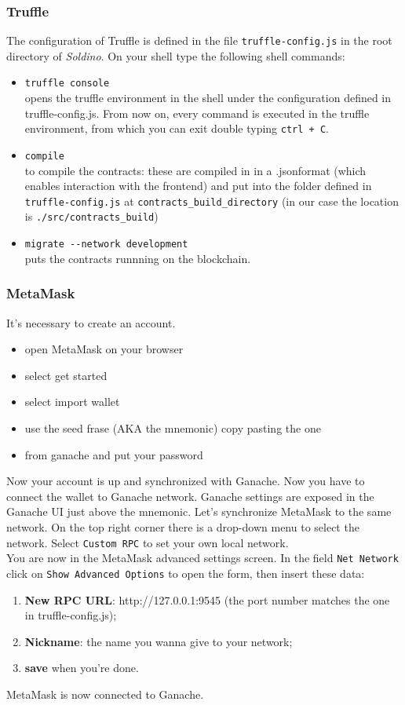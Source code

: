 \subsubsection{Truffle}
The configuration of Truffle is defined in the file \texttt{truffle-config.js} in the root directory of \textit{Soldino}.
On your shell type the following shell commands:
\begin{itemize}
	\item \texttt{truffle console}\\
	opens the truffle environment in the shell under the configuration defined in truffle-config.js. From now on, every command is executed in the truffle environment, from which you can exit double typing \texttt{ctrl + C}.
	\item \texttt{compile}\\
	to compile the contracts: these are compiled in in a .json\glosp format (which enables interaction with the frontend) and put into the folder defined in \texttt{truffle-config.js} at \texttt{contracts\_build\_directory} (in our case the location is \texttt{./src/contracts\_build})
	\item \texttt{migrate -{}-network development}\\
	puts the contracts runnning on the blockchain\glo. 
\end{itemize}

\subsubsection{MetaMask}
It's necessary to create an account.
\begin{itemize}
	\item open MetaMask on your browser
	\item select get started
	\item select import wallet
	\item use the seed frase (AKA the mnemonic) copy pasting the one \item from ganache and put your password
\end{itemize}
Now your account is up and synchronized with Ganache.
Now you have to connect the wallet to Ganache network. Ganache settings are exposed in the Ganache UI just above the mnemonic.
Let's synchronize MetaMask to the same network. On the top right corner there is a drop-down menu to select the network. Select \texttt{Custom RPC} to set your own local network.\\
You are now in the MetaMask advanced settings screen. In the field \texttt{Net Network} click on \texttt{Show Advanced Options} to open the form, then insert these data:
\begin{enumerate}
	\item \textbf{New RPC URL}: http://127.0.0.1:9545 (the port number matches the one in truffle-config.js);
	\item \textbf{Nickname}: the name you wanna give to your network;
	\item \textbf{save} when you're done.
\end{enumerate}
MetaMask is now connected to Ganache.\\

